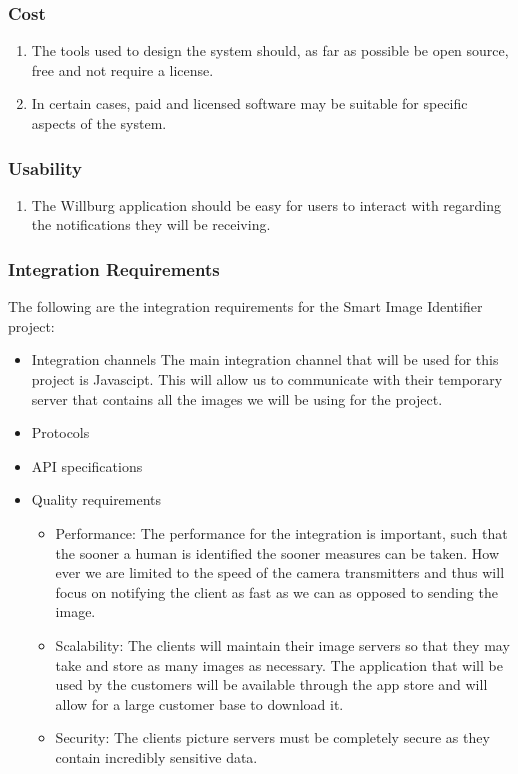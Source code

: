 \documentclass[a4paper,12pt]{report}
\begin{document}
\subsubsection{Cost}
\begin{enumerate}
	\item The tools used to design the system should, as far as possible be open source, free and not require a license.
	\item In certain cases, paid and licensed software may be suitable for specific aspects of the system. 
\end{enumerate}
\subsubsection{Usability}
\begin{enumerate}
	\item The Willburg application should be easy for users to interact with regarding the notifications they will be receiving.
\end{enumerate}
\newpage
 \subsubsection{Integration Requirements}
 The following are the integration requirements for the Smart Image Identifier project:
 	\begin{itemize}
 		\item Integration channels The main integration channel that will be used for this project is Javascipt. This will allow us to communicate with their temporary server that contains all the images we will be using for the project.
 	\end{itemize}
	\begin{itemize}
 		\item Protocols
	\end{itemize}
	\begin{itemize}
 		\item API specifications
	\end{itemize}
	\begin{itemize}
 		\item Quality requirements
			\begin{itemize}
				\item Performance: The performance for the integration is important, such that the sooner a human is identified the sooner measures can be taken. How ever we are limited to the speed of the camera transmitters and thus will focus on notifying the client as fast as we can as opposed to sending the image.
				\item Scalability: The clients will maintain their image servers so that they may take and store as many images as necessary. The application that will be used by the customers will be available through the app store and will allow for a large customer base to download it.
				\item Security: The clients picture servers must be completely secure as they contain incredibly sensitive data.
			\end{itemize}
	\end{itemize}
	
\end{document}
